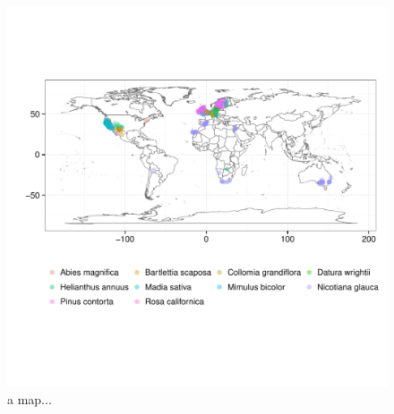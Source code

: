 \documentclass[letterpaper,superscriptaddress,showkeys,longbibliography,10pt]{revtex4-1}\usepackage{graphicx, color}
\newenvironment{knitrout}{}{} %
\begin{document}
\begin{appendices}
\begin{figure}[!ht]
\begin{knitrout}
{\centering \includegraphics[width=.8\textwidth]{figure/map} 

}



\end{knitrout}

\caption{a map...} 
\end{figure}

\end{appendices}
\end{document}
